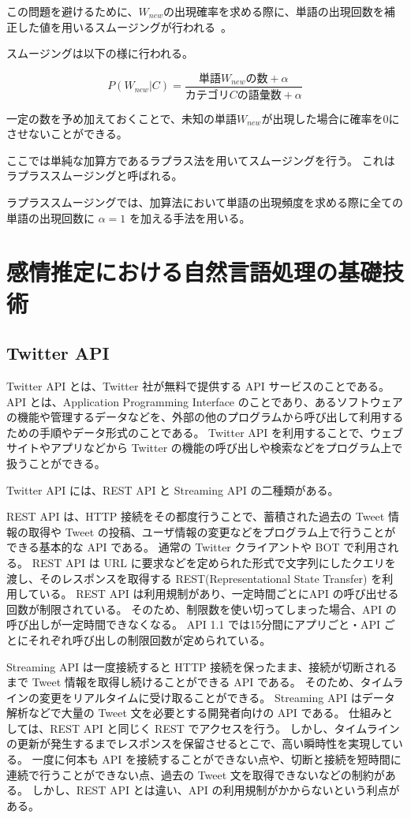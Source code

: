 \documentclass[11pt,a4j]{jsarticle}
\begin{document}
この問題を避けるために、$W_\mathit{new}$の出現確率を求める際に、単語の出現回数を補正した値を用いるスムージングが行われる~。

スムージングは以下の様に行われる。

\[
P(W_\mathit{new}|C)=\frac{単語 W_\mathit{new} の数 + \alpha }{カテゴリC の語彙数 + \alpha }
\]

一定の数を予め加えておくことで、未知の単語$W_\mathit{new}$が出現した場合に確率を0にさせないことができる。

ここでは単純な加算方であるラプラス法を用いてスムージングを行う。
これはラプラススムージングと呼ばれる。

ラプラススムージングでは、加算法において単語の出現頻度を求める際に全ての単語の出現回数に $\alpha=1$ を加える手法を用いる。
 
\section{感情推定における自然言語処理の基礎技術}
\subsection{Twitter API}
 Twitter API とは、Twitter 社が無料で提供する API サービスのことである。
API とは、Application Programming Interface のことであり、あるソフトウェアの機能や管理するデータなどを、外部の他のプログラムから呼び出して利用するための手順やデータ形式のことである。
Twitter API を利用することで、ウェブサイトやアプリなどから Twitter の機能の呼び出しや検索などをプログラム上で扱うことができる。

Twitter API には、REST API と Streaming API の二種類がある。

REST API は、HTTP 接続をその都度行うことで、蓄積された過去の Tweet 情報の取得や Tweet の投稿、ユーザ情報の変更などをプログラム上で行うことができる基本的な API である。
通常の Twitter クライアントや BOT で利用される。
REST API は URL に要求などを定められた形式で文字列にしたクエリを渡し、そのレスポンスを取得する REST(Representational State Transfer) を利用している。
REST API は利用規制があり、一定時間ごとにAPI の呼び出せる回数が制限されている。
そのため、制限数を使い切ってしまった場合、API の呼び出しが一定時間できなくなる。
API 1.1 では15分間にアプリごと・API ごとにそれぞれ呼び出しの制限回数が定められている。

Streaming API は一度接続すると HTTP 接続を保ったまま、接続が切断されるまで Tweet 情報を取得し続けることができる API である。
そのため、タイムラインの変更をリアルタイムに受け取ることができる。
Streaming API はデータ解析などで大量の Tweet 文を必要とする開発者向けの API である。
仕組みとしては、REST API と同じく REST でアクセスを行う。
しかし、タイムラインの更新が発生するまでレスポンスを保留させるとこで、高い瞬時性を実現している。
一度に何本も API を接続することができない点や、切断と接続を短時間に連続で行うことができない点、過去の Tweet 文を取得できないなどの制約がある。
しかし、REST API とは違い、API の利用規制がかからないという利点がある。
\end{document}

